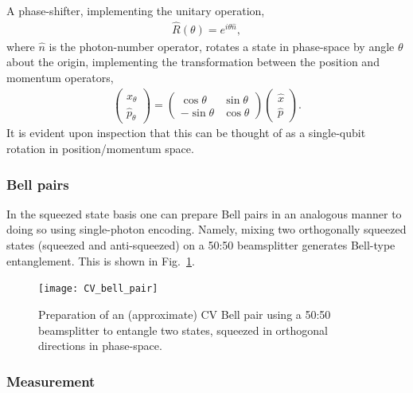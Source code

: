 A phase-shifter, implementing the unitary operation,
\begin{align}
\hat{R}(\theta) = e^{i\theta \hat{n}},
\end{align}
where $\hat{n}$ is the photon-number operator, rotates a state in phase-space by angle $\theta$ about the origin, implementing the transformation between the position and momentum operators,
\begin{align}\label{eq:xp_theta}
\begin{pmatrix}
\hat x_{\theta}\\
\hat p_{\theta}
\end{pmatrix}
=
\begin{pmatrix}
\cos\theta & \sin\theta \\
-\sin\theta & \cos\theta
\end{pmatrix}
\begin{pmatrix}
\hat x\\
\hat p
\end{pmatrix}.
\end{align}
It is evident upon inspection that this can be thought of as a single-qubit rotation in position/momentum space.

%
%

\subsubsection{Bell pairs}\label{sec:CV_bell_pairs}

In the squeezed state basis one can prepare Bell pairs in an analogous manner to doing so using single-photon encoding. Namely, mixing two orthogonally squeezed states (squeezed and anti-squeezed) on a 50:50 beamsplitter generates Bell-type entanglement. This is shown in Fig.~\ref{fig:CV_bell_pair}.

\begin{figure}[!htbp]
\texttt{[image: CV\_bell\_pair]}
\captionspacefig \caption{Preparation of an (approximate) CV Bell pair using a 50:50 beamsplitter to entangle two states, squeezed in orthogonal directions in phase-space.}\label{fig:CV_bell_pair}	
\end{figure}

%
%

\subsubsection{Measurement}

